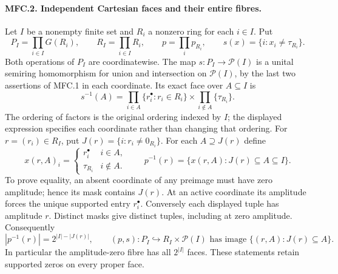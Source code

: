 \paragraph{MFC.2. Independent Cartesian faces and their entire fibres.}
Let \(I\) be a nonempty finite set and \(R_i\) a nonzero ring for each
\(i\in I\). Put
\[
 P_I=\prod_{i\in I}G(R_i),\qquad R_I=\prod_{i\in I}R_i,\qquad
 p=\prod_i p_{R_i},\qquad
 s(x)=\{i:x_i\ne\tau_{R_i}\}.                              \tag{MFC.4}
\]
Both operations of \(P_I\) are coordinatewise. The map
\(s:P_I\to\mathcal P(I)\) is a unital semiring homomorphism for
union and intersection on \(\mathcal P(I)\), by the last two assertions
of MFC.1 in each coordinate. Its exact face over \(A\subseteq I\) is
\[
 s^{-1}(A)=
 \prod_{i\in A}\{r_i^\bullet:r_i\in R_i\}
 \times\prod_{i\notin A}\{\tau_{R_i}\}.                      \tag{MFC.5}
\]
The ordering of factors is the original ordering indexed by \(I\);
the displayed expression specifies each coordinate rather than changing
that ordering.
For \(r=(r_i)\in R_I\), put \(J(r)=\{i:r_i\ne0_{R_i}\}\). For each
\(A\supseteq J(r)\) define
\[
 x(r,A)_i=
 \begin{cases}r_i^\bullet&i\in A,\\
               \tau_{R_i}&i\notin A.
 \end{cases}
 \qquad
 p^{-1}(r)=\{x(r,A):J(r)\subseteq A\subseteq I\}.             \tag{MFC.6}
\]
To prove equality, an absent coordinate of any preimage must have zero
amplitude; hence its mask contains \(J(r)\). At an active coordinate its
amplitude forces the unique supported entry \(r_i^\bullet\).
Conversely each displayed tuple has amplitude \(r\). Distinct masks give
distinct tuples, including at zero amplitude. Consequently
\[
 |p^{-1}(r)|=2^{|I|-|J(r)|},\qquad
 (p,s):P_I\hookrightarrow R_I\times\mathcal P(I)
 \text{ has image }\{(r,A):J(r)\subseteq A\}.                \tag{MFC.7}
\]
In particular the amplitude-zero fibre has all \(2^{|I|}\) faces.
These statements retain supported zeros on every proper face.

